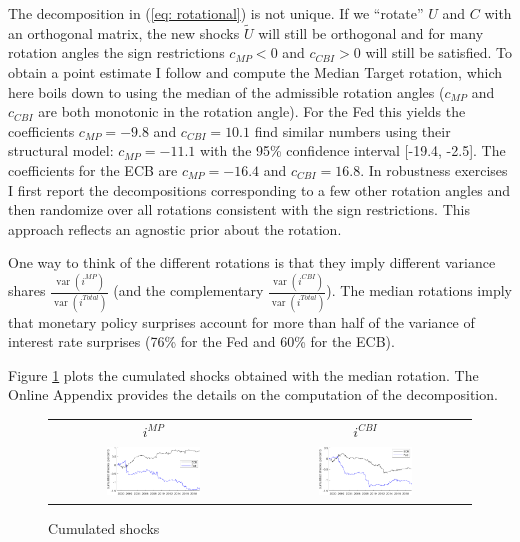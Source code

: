 \documentclass[a4paper,12pt]{article}
\begin{document}
\newcommand{\vsmp}{\frac{\operatorname{var}(i^{MP})}{\operatorname{var}(i^{Total})}}
\newcommand{\vscbi}{\frac{\operatorname{var}(i^{CBI})}{\operatorname{var}(i^{Total})}}

The decomposition in (\ref{eq: rotational}) is not unique. 
If we ``rotate'' $U$ and $C$ with an orthogonal matrix, the new shocks $\tilde{U}$ will still be
orthogonal and for many rotation angles
the sign restrictions $c_{MP}<0$ and $c_{CBI}>0$ will still be satisfied.
To obtain a point estimate I follow \cite{Fry_Pagan_2011} and compute the Median Target rotation, which here boils down to using the median of the admissible rotation angles
($c_{MP}$ and $c_{CBI}$ are both monotonic in the rotation angle).
For the Fed this yields the coefficients $c_{MP}=-9.8$ and $c_{CBI}=10.1$ 
\cite{Nakamura_Steinsson_2018} find similar numbers using their structural model:
$c_{MP}=-11.1$ with the 95\% confidence interval [-19.4, -2.5]. 
The coefficients for the ECB are $c_{MP}=-16.4$ and $c_{CBI}=16.8$.
In robustness exercises I first report the decompositions corresponding to a few other rotation angles and then randomize over all rotations consistent with the sign restrictions.
This approach reflects an agnostic prior about the rotation.

One way to think of the different rotations is that they imply different variance shares $\vsmp$ (and the complementary $\vscbi$). The median rotations imply that monetary policy surprises account for more than half of the variance of interest rate surprises (76\% for the Fed and 60\% for the ECB). 

Figure \ref{fig: cumulated shocks} plots the cumulated shocks obtained with the median rotation.
The Online Appendix provides the details on the computation of the decomposition.


\begin{figure}[!htbp]
\caption{Cumulated shocks}\label{fig: cumulated shocks}
\begin{center}
\begin{tabular}{cc}
\small $i^{MP}$ & \small $i^{CBI}$ \\
\includegraphics[width=0.47\textwidth]{figures/cumulated_mp_median} &
\includegraphics[width=0.47\textwidth]{figures/cumulated_cbi_median}\\
\end{tabular}
\end{center}
\end{figure}
\end{document}
